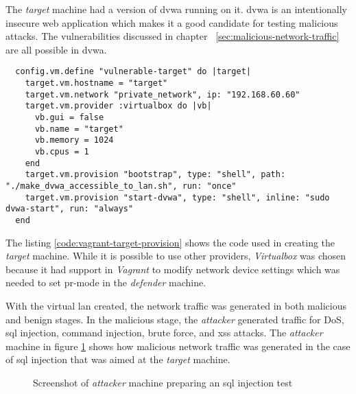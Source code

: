 The \emph{target} machine had a version of \gls{dvwa} running on it.
\gls{dvwa} is an intentionally insecure web application which makes it a good candidate for testing malicious attacks.
The vulnerabilities discussed in chapter ~\ref{sec:malicious-network-traffic} are all possible in \gls{dvwa}.

\begin{code}
    \begin{verbatim}
  config.vm.define "vulnerable-target" do |target|
    target.vm.hostname = "target"
    target.vm.network "private_network", ip: "192.168.60.60"
    target.vm.provider :virtualbox do |vb|
      vb.gui = false
      vb.name = "target"
      vb.memory = 1024
      vb.cpus = 1
    end
    target.vm.provision "bootstrap", type: "shell", path: "./make_dvwa_accessible_to_lan.sh", run: "once"
    target.vm.provision "start-dvwa", type: "shell", inline: "sudo dvwa-start", run: "always"
  end
    \end{verbatim}
\label{code:vagrant-target-provision}
\end{code}

The listing \ref{code:vagrant-target-provision} shows the code used in creating the \emph{target} machine.
While it is possible to use other providers, \emph{Virtualbox} was chosen because it had support in \emph{Vagrant} to modify
network device settings which was needed to set \gls{pr-mode} in the \emph{defender} machine.


With the virtual \gls{lan} created, the network traffic was generated in both malicious and benign stages.
In the malicious stage, the \emph{attacker} generated traffic for \gls{DoS}, \gls{sql} injection, command injection, brute force, and \gls{xss} attacks.
The \emph{attacker} machine in figure \ref{fig:attacker-box} shows how malicious network traffic was generated in the case of \gls{sql} injection that was aimed at the \emph{target} machine.

\begin{figure}[H]
    \centering
    \caption{Screenshot of \emph{attacker} machine preparing an \gls{sql} injection test}
    \label{fig:attacker-box}
\end{figure}


